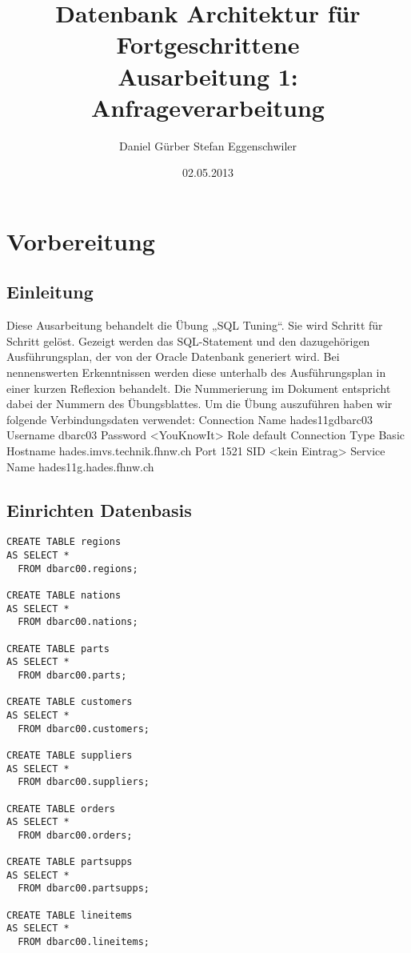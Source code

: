 \documentclass[10pt]{article}
\title{
\vspace{4cm}
\huge{Datenbank Architektur für Fortgeschrittene}\\
\vspace{0.2cm}
\Large{Ausarbeitung 1: Anfrageverarbeitung}\\
}
\author{Daniel Gürber \cr Stefan Eggenschwiler}
\date{02.05.2013}
\begin{document}
\maketitle
\thispagestyle{fancy}

\newpage

\tableofcontents	


\newpage
\setcounter{page}{1}


\section{Vorbereitung}
\subsection{Einleitung}
Diese Ausarbeitung behandelt die Übung „SQL Tuning“. Sie wird Schritt für Schritt gelöst. Gezeigt werden das SQL-Statement und den dazugehörigen Ausführungsplan, der von der Oracle Datenbank generiert wird. Bei nennenswerten Erkenntnissen werden diese unterhalb des Ausführungsplan in einer kurzen Reflexion behandelt. Die Nummerierung im Dokument entspricht dabei der Nummern des Übungsblattes.
Um die Übung auszuführen haben wir folgende Verbindungsdaten verwendet: \newline \newline
Connection Name hades11gdbarc03 \newline
Username dbarc03 \newline
Password <YouKnowIt> \newline
Role default \newline
Connection Type Basic \newline
Hostname hades.imvs.technik.fhnw.ch \newline
Port 1521 \newline
SID <kein Eintrag> \newline
Service Name hades11g.hades.fhnw.ch

\subsection{Einrichten Datenbasis}
\begin{lstlisting}[style=sql]
CREATE TABLE regions
AS SELECT *
  FROM dbarc00.regions;
  
CREATE TABLE nations
AS SELECT *
  FROM dbarc00.nations;

CREATE TABLE parts
AS SELECT *
  FROM dbarc00.parts;
  
CREATE TABLE customers
AS SELECT *
  FROM dbarc00.customers;

CREATE TABLE suppliers
AS SELECT *
  FROM dbarc00.suppliers;

CREATE TABLE orders
AS SELECT *
  FROM dbarc00.orders;

CREATE TABLE partsupps
AS SELECT *
  FROM dbarc00.partsupps;

CREATE TABLE lineitems
AS SELECT *
  FROM dbarc00.lineitems;
\end{lstlisting}
\newpage
\end{document}
